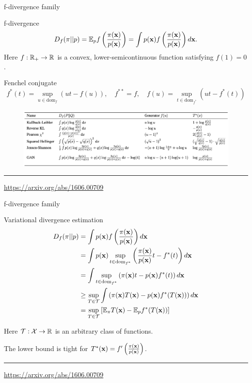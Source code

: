 \begin{frame}{f-divergence family}
	
	\begin{block}{f-divergence}
		\vspace{-0.3cm}
		\[
		D_f(\pi || p) = \mathbb{E}_p  f\left( \frac{\pi(\mathbf{x})}{p(\mathbf{x})} \right)  = \int p(\mathbf{x}) f\left( \frac{\pi(\mathbf{x})}{p(\mathbf{x})} \right) d \mathbf{x}.
		\]
		Here $f: \mathbb{R}_+ \rightarrow \mathbb{R}$ is a convex, lower-semicontinuous function satisfying $f(1) = 0$.
	\end{block}
	\begin{block}{Fenchel conjugate}
		\vspace{-0.5cm}
		\[
		f^*(t) = \sup_{u \in \text{dom}_f} \left( ut - f(u) \right), \quad f^{**} = f, \quad f(u) = \sup_{t \in \text{dom}_{f^*}} \left( ut - f^*(t) \right)
		\]
		\vspace{-0.5cm}
	\end{block}
	\begin{figure}
		\centering
		\includegraphics[width=0.85\linewidth]{figs/f_divs}
	\end{figure}
	\vfill
	\hrule\medskip 
	{\scriptsize \href{https://arxiv.org/abs/1606.00709}{https://arxiv.org/abs/1606.00709}}
\end{frame}
\begin{frame}{f-divergence family}
	\begin{block}{Variational divergence estimation}
		\vspace{-0.3cm}
		\begin{align*}
			D_f(\pi || p) &= \int p(\mathbf{x}) f\left( \frac{\pi(\mathbf{x})}{p(\mathbf{x})} \right) d \mathbf{x} \\
			& = \int p(\mathbf{x}) \sup_{t \in \text{dom}_{f^*}} \left( \frac{\pi(\mathbf{x})}{p(\mathbf{x})} t - f^*(t) \right) d \mathbf{x} \\
			& = \int \sup_{t \in \text{dom}_{f^*}} \left( \pi(\mathbf{x})t - p(\mathbf{x}) f^*(t) \right) d \mathbf{x} \\
			& \geq \sup_{T \in \mathcal{T}} \int \left( \pi(\mathbf{x})T(\mathbf{x}) - p(\mathbf{x}) f^*(T(\mathbf{x})) \right) d \mathbf{x} \\
			& = \sup_{T \in \mathcal{T}} \left[\mathbb{E}_{\pi}T(\mathbf{x}) -  \mathbb{E}_p f^*(T(\mathbf{x})) \right]
		\end{align*}
	\end{block}
	Here $\mathcal{T}: \mathcal{X} \rightarrow \mathbb{R}$ is an arbitrary class of functions.
	
	The lower bound is tight for $T^*(\mathbf{x}) = f'\left( \frac{\pi(\mathbf{x})}{p(\mathbf{x})} \right)$.
	\vfill
	\hrule\medskip 
	{\scriptsize \href{https://arxiv.org/abs/1606.00709}{https://arxiv.org/abs/1606.00709}}
\end{frame}
